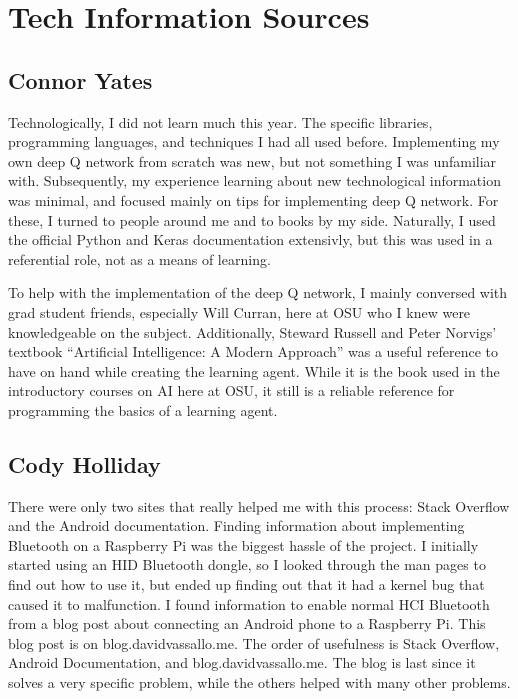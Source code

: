 \section{Tech Information Sources}
\subsection{Connor Yates}
Technologically, I did not learn much this year. The specific libraries, programming languages, and techniques I had all used before. Implementing my own deep Q network from scratch was new, but not something I was unfamiliar with. Subsequently, my experience learning about new technological information was minimal, and focused mainly on tips for implementing deep Q network. For these, I turned to people around me and to books by my side. Naturally, I used the official Python and Keras documentation extensivly, but this was used in a referential role, not as a means of learning.

To help with the implementation of the deep Q network, I mainly conversed with grad student friends, especially Will Curran, here at OSU who I knew were knowledgeable on the subject. Additionally, Steward Russell and Peter Norvigs' textbook ``Artificial Intelligence: A Modern Approach'' was a useful reference to have on hand while creating the learning agent. While it is the book used in the introductory courses on AI here at OSU, it still is a reliable reference for programming the basics of a learning agent.

\subsection{Cody Holliday}
There were only two sites that really helped me with this process: Stack Overflow and the Android documentation.
Finding information about implementing Bluetooth on a Raspberry Pi was the biggest hassle of the project.
I initially started using an HID Bluetooth dongle, so I looked through the man pages to find out how to use it, but ended up finding out that it had a kernel bug that caused it to malfunction.
I found information to enable normal HCI Bluetooth from a blog post about connecting an Android phone to a Raspberry Pi.
This blog post is on blog.davidvassallo.me.
The order of usefulness is Stack Overflow, Android Documentation, and blog.davidvassallo.me.
The blog is last since it solves a very specific problem, while the others helped with many other problems.

